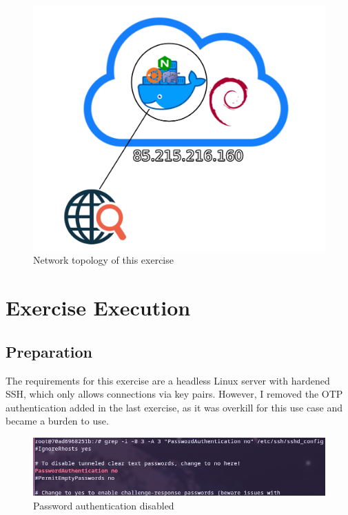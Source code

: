 \documentclass[a4paper]{article}
\begin{document}
\begin{figure}[h]
	\includegraphics[scale=0.3]{images/topology.png}
	\centering
	\caption{Network topology of this exercise}
\end{figure}

\newpage

\section{Exercise Execution}

\subsection{Preparation}
The requirements for this exercise are a headless Linux server with hardened SSH, which only allows connections via key pairs. However, I removed the OTP authentication added in the last exercise, as it was overkill for this use case and became a burden to use.
\begin{figure}[h]
	\includegraphics[scale=0.26]{images/sshnopw.png}
	\centering
	\caption{Password authentication disabled}
\end{figure} 
\end{document}

